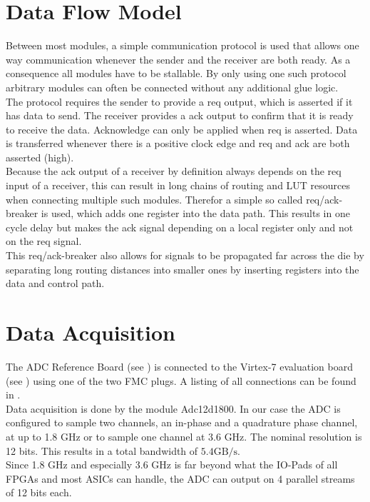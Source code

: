 \section{Data Flow Model}
\label{sec:fpga_reqack}
Between most modules, a simple communication protocol is used that allows
one way communication whenever the sender and the receiver are both
ready. As a consequence all modules have to be stallable. By only using
one such protocol arbitrary modules can often be connected
without any additional glue logic. \\

The protocol requires the sender to provide a \acrfull{req} output, which
is asserted if it has data to send. The receiver provides a \gls{ack}
output to confirm that it is ready to receive the data.
Acknowledge can only be applied when \gls{req} is asserted.
Data is transferred whenever there is a positive clock edge and
\gls{req} and \gls{ack} are both asserted (high). \\

Because the \gls{ack} output of a receiver by definition always depends on the
\gls{req} input of a receiver, this can result in long chains of routing and
\gls{LUT} resources when connecting multiple such modules.
Therefor a simple so called \gls{req}/\gls{ack}-breaker is used, which adds one
register into the data path. This results in one cycle delay but makes the
\gls{ack} signal depending on a local register only and not on the
\gls{req} signal. \\

This \gls{req}/\gls{ack}-breaker also allows for signals to be propagated
far across the die by separating long routing distances into smaller
ones by inserting registers into the data and control path. \\

\section{Data Acquisition}
\label{sec:fpga_adc}

The \gls{ADC} Reference Board (see ) is connected
to the Virtex-7 evaluation board (see )
using one of the two \gls{FMC} plugs.
A listing of all connections can be found in . \\

Data acquisition is done by the module Adc12d1800. In our case the ADC is
configured to sample two channels, an in-phase and a quadrature phase channel,
at up to 1.8 GHz or to sample one channel at 3.6 GHz.
The nominal resolution is 12 bits. This results in a total bandwidth of
$5.4 \text{GB}/\text{s}$. \\
Since 1.8 GHz and especially 3.6 GHz is far beyond what the IO-Pads of all
\glspl{FPGA}  and most \glspl{ASIC} can handle,
the ADC can output on 4 parallel streams of 12 bits each. \\

